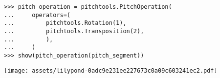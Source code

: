 \begin{abjadbookoutput}
\begin{singlespacing}
\vspace{-0.5\baselineskip}
\begin{lstlisting}
>>> pitch_operation = pitchtools.PitchOperation(
...     operators=(
...         pitchtools.Rotation(1),
...         pitchtools.Transposition(2),
...         ),
...     )
>>> show(pitch_operation(pitch_segment))
\end{lstlisting}
\noindent\texttt{[image: assets/lilypond-0adc9e231ee227673c0a09c603241ec2.pdf]}
\end{singlespacing}
\end{abjadbookoutput}